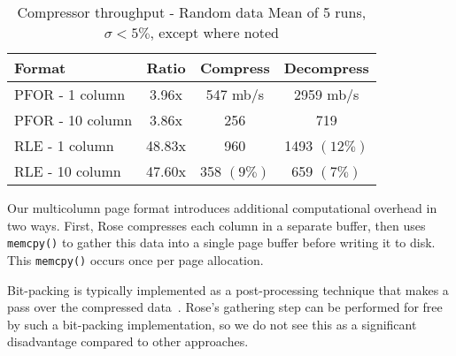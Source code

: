 \documentclass{vldb}
\newcommand{\rows}{Rose\xspace}
\newcommand{\rowss}{Rose's\xspace}
\begin{document}



\begin{table}
\caption{Compressor throughput - Random data Mean of 5 runs, $\sigma<5\%$, except where noted}
\centering
\label{table:perf}
\begin{tabular}{|l|c|c|c|} \hline
Format        & Ratio & Compress  & Decompress\\ \hline %
PFOR - 1 column    &    3.96x  &  547 mb/s &    2959 mb/s \\ \hline %
PFOR - 10 column   &    3.86x  &  256 &      719 \\ \hline %
RLE - 1 column     &   48.83x  &  960  &    1493 $(12\%)$ \\ \hline %
RLE - 10 column    &   47.60x  &  358 $(9\%)$ & 659 $(7\%)$ \\  %
\hline\end{tabular}
\end{table}


Our multicolumn page format introduces additional computational
overhead in two ways.  First, \rows compresses each column in a
separate buffer, then uses {\tt memcpy()} to gather this data into a
single page buffer before writing it to disk.  This {\tt memcpy()}
occurs once per page allocation.

Bit-packing is typically implemented as a post-processing
technique that makes a pass over the compressed data~\cite{pfor}.  \rowss
gathering step can be performed for free by such a bit-packing
implementation, so we do not see this as a significant disadvantage
compared to other approaches.
\end{document}

